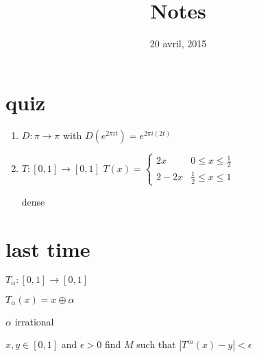 \documentclass[letterpaper]{article}
\begin{document}
\title{Notes}
\date{20 avril, 2015}
\maketitle
\section*{quiz}
\begin{enumerate}
\item
$D:\pi\to\pi$ with $D(e^{2\pi it})=e^{2\pi i(2t)}$
\item
$T:[0,1]\to[0,1]$
$T(x)=\begin{cases}2x&0\le x\le \frac{1}{2}\\2-2x&\frac{1}{2}\le x\le 1\end{cases}$

dense
\end{enumerate}

\section*{last time}
$T_\alpha:[0,1]\to[0,1]$

$T_\alpha(x)=x\oplus \alpha$

$\alpha$ irrational

$x,y\in [0,1]$ and $\epsilon>0$ find $M$ such that $|T^m(x)-y|<\epsilon$
\end{document}
